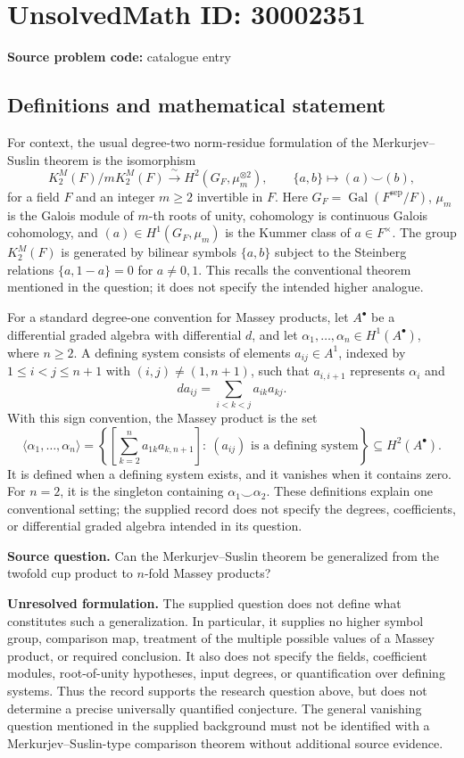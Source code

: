 \documentclass[11pt]{article}
\begin{document}
\section*{UnsolvedMath ID: 30002351}
\textbf{Source problem code:} catalogue entry
\subsection{Definitions and mathematical statement}
For context, the usual degree-two norm-residue formulation of the Merkurjev--Suslin theorem is the isomorphism
\[
K_2^M(F)/mK_2^M(F)\xrightarrow{\ \sim\ }H^2(G_F,\mu_m^{\otimes 2}),
\qquad \{a,b\}\longmapsto (a)\smile(b),
\]
for a field \(F\) and an integer \(m\geq 2\) invertible in \(F\). Here \(G_F=\operatorname{Gal}(F^{\mathrm{sep}}/F)\), \(\mu_m\) is the Galois module of \(m\)-th roots of unity, cohomology is continuous Galois cohomology, and \((a)\in H^1(G_F,\mu_m)\) is the Kummer class of \(a\in F^\times\). The group \(K_2^M(F)\) is generated by bilinear symbols \(\{a,b\}\) subject to the Steinberg relations \(\{a,1-a\}=0\) for \(a\neq 0,1\). This recalls the conventional theorem mentioned in the question; it does not specify the intended higher analogue.

For a standard degree-one convention for Massey products, let \(A^\bullet\) be a differential graded algebra with differential \(d\), and let \(\alpha_1,\ldots,\alpha_n\in H^1(A^\bullet)\), where \(n\geq 2\). A defining system consists of elements \(a_{ij}\in A^1\), indexed by \(1\leq i<j\leq n+1\) with \((i,j)\neq(1,n+1)\), such that \(a_{i,i+1}\) represents \(\alpha_i\) and
\[
d a_{ij}=\sum_{i<k<j}a_{ik}a_{kj}.
\]
With this sign convention, the Massey product is the set
\[
\langle\alpha_1,\ldots,\alpha_n\rangle
=
\left\{
\left[\sum_{k=2}^{n}a_{1k}a_{k,n+1}\right]
:\ (a_{ij})\text{ is a defining system}
\right\}\subseteq H^2(A^\bullet).
\]
It is defined when a defining system exists, and it vanishes when it contains zero. For \(n=2\), it is the singleton containing \(\alpha_1\smile\alpha_2\). These definitions explain one conventional setting; the supplied record does not specify the degrees, coefficients, or differential graded algebra intended in its question.

\textbf{Source question.} Can the Merkurjev--Suslin theorem be generalized from the twofold cup product to \(n\)-fold Massey products?

\textbf{Unresolved formulation.} The supplied question does not define what constitutes such a generalization. In particular, it supplies no higher symbol group, comparison map, treatment of the multiple possible values of a Massey product, or required conclusion. It also does not specify the fields, coefficient modules, root-of-unity hypotheses, input degrees, or quantification over defining systems. Thus the record supports the research question above, but does not determine a precise universally quantified conjecture. The general vanishing question mentioned in the supplied background must not be identified with a Merkurjev--Suslin-type comparison theorem without additional source evidence.
\end{document}
